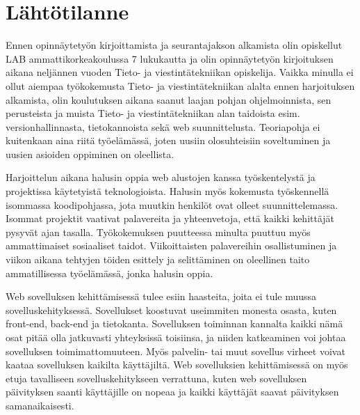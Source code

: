 \documentclass[11pt,a4paper,titlepage,oneside]{article}
\begin{document}
\medskip










\newpage
\section{Lähtötilanne}         %




Ennen opinnäytetyön kirjoittamista ja seurantajakson alkamista olin opiskellut LAB ammattikorkeakoulussa 7 lukukautta ja
olin opinnäytetyön kirjoituksen aikana neljännen vuoden Tieto- ja viestintätekniikan opiskelija.
Vaikka minulla ei ollut aiempaa työkokemusta Tieto- ja viestintätekniikan alalta ennen harjoituksen alkamista,
olin koulutuksen aikana saanut laajan pohjan ohjelmoinnista,
sen perusteista ja muista Tieto- ja viestintätekniikan alan taidoista esim. versionhallinnasta, tietokannoista sekä web suunnittelusta.
Teoriapohja ei kuitenkaan aina riitä työelämässä, joten uusiin olosuhteisiin soveltuminen ja uusien asioiden oppiminen on oleellista.
\medskip




Harjoittelun aikana halusin oppia web alustojen kanssa työskentelystä ja projektissa käytetyistä teknologioista.
Halusin myös kokemusta työskennellä isommassa koodipohjassa, jota muutkin henkilöt ovat olleet suunnittelemassa.
Isommat projektit vaativat palavereita ja yhteenvetoja, että kaikki kehittäjät pysyvät ajan tasalla.
Työkokemuksen puutteessa minulta puuttuu myös ammattimaiset sosiaaliset taidot.
Viikoittaisten palavereihin osallistuminen ja viikon aikana tehtyjen töiden esittely 
ja selittäminen on oleellinen taito ammatillisessa työelämässä, jonka halusin oppia.
\medskip


Web sovelluksen kehittämisessä tulee esiin haasteita, joita ei tule muussa sovelluskehityksessä.
Sovellukset koostuvat useimmiten monesta osasta, kuten front-end, back-end ja tietokanta.
% 
Sovelluksen toiminnan kannalta kaikki nämä osat pitää olla jatkuvasti yhteyksissä toisiinsa, ja niiden katkeaminen 
voi johtaa sovelluksen toimimattomuuteen.
Myös palvelin- tai muut sovellus virheet voivat kaataa sovelluksen kaikilta käyttäjiltä. 
Web sovelluksien kehittämisessä on myös etuja tavalliseen sovelluskehitykseen verrattuna, kuten 
web sovelluksen päivityksen saanti käyttäjille on nopeaa ja kaikki käyttäjät saavat päivityksen samanaikaisesti.
\medskip
\end{document}
